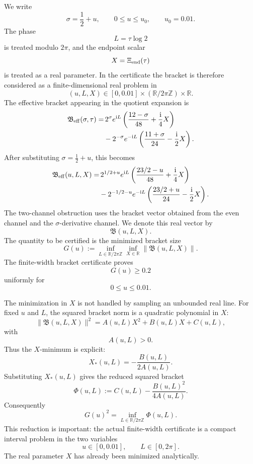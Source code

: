 \documentclass[11pt]{article}
\newcommand{\ii}{\mathrm{i}}
\newcommand{\sig}{\sigma}
\newcommand{\tauh}{\tau}
\newcommand{\Beff}{\mathfrak B_{\rm eff}}
\newcommand{\Bvec}{\mathfrak B}
\begin{document}
We write
\[
        \sig=\frac12+u,
        \qquad
        0\le u\le u_0,
        \qquad
        u_0=0.01.
\]
The phase
\[
        L=\tauh\log 2
\]
is treated modulo \(2\pi\), and the endpoint scalar
\[
        X=\Xi_{\rm end}(\tauh)
\]
is treated as a real parameter.  In the certificate the bracket is therefore
considered as a finite-dimensional real problem in
\[
        (u,L,X)\in[0,0.01]\times(\mathbb R/2\pi\mathbb Z)\times\mathbb R.
\]
The effective bracket appearing in the quotient expansion is
\[
\begin{aligned}
        \Beff(\sig,\tauh)
        =
        &\,
        2^\sig e^{\ii L}
        \left(
            \frac{12-\sig}{48}
            +
            \frac{\ii}{4}X
        \right)
        \\
        &-
        2^{-\sig}e^{-\ii L}
        \left(
            \frac{11+\sig}{24}
            -
            \frac{\ii}{2}X
        \right).
\end{aligned}
\]
After substituting \(\sig=\tfrac12+u\), this becomes
\[
\begin{aligned}
        \Beff(u,L,X)
        =
        &\,
        2^{1/2+u} e^{\ii L}
        \left(
            \frac{23/2-u}{48}
            +
            \frac{\ii}{4}X
        \right)
        \\
        &-
        2^{-1/2-u} e^{-\ii L}
        \left(
            \frac{23/2+u}{24}
            -
            \frac{\ii}{2}X
        \right).
\end{aligned}
\]
The two-channel obstruction uses the bracket vector obtained from the even
channel and the \(\sig\)-derivative channel.  We denote this real vector by
\[
        \Bvec(u,L,X).
\]
The quantity to be certified is the minimized bracket size
\[
        G(u)
        :=
        \inf_{L\in\mathbb R/2\pi\mathbb Z}
        \inf_{X\in\mathbb R}
        \|\Bvec(u,L,X)\|.
\]
The finite-width bracket certificate proves
\[
        G(u)\ge 0.2
\]
uniformly for
\[
        0\le u\le0.01.
\]

The minimization in \(X\) is not handled by sampling an unbounded real line.
For fixed \(u\) and \(L\), the squared bracket norm is a quadratic polynomial
in \(X\):
\[
        \|\Bvec(u,L,X)\|^2
        =
        A(u,L)X^2+B(u,L)X+C(u,L),
\]
with
\[
        A(u,L)>0.
\]
Thus the \(X\)-minimum is explicit:
\[
        X_*(u,L)
        =
        -\frac{B(u,L)}{2A(u,L)}.
\]
Substituting \(X_*(u,L)\) gives the reduced squared bracket
\[
        \Phi(u,L)
        :=
        C(u,L)
        -
        \frac{B(u,L)^2}{4A(u,L)}.
\]
Consequently
\[
        G(u)^2
        =
        \inf_{L\in\mathbb R/2\pi\mathbb Z}
        \Phi(u,L).
\]
This reduction is important: the actual finite-width certificate is a compact
interval problem in the two variables
\[
        u\in[0,0.01],
        \qquad
        L\in[0,2\pi].
\]
The real parameter \(X\) has already been minimized analytically.
\end{document}
